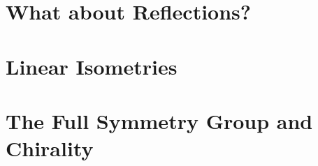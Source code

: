 \documentclass[11pt, oneside]{article}   	%
\begin{document}
\section{What about Reflections?}
\be
\item 
\item 
\item 
\item 
\item 
\ee
\section{Linear Isometries}
\be
\item 
\item 
\item 
\item 
\item 
\ee
\section{The Full Symmetry Group and Chirality}
\be
\item 
\item 
\item 
\item 
\item 
\item 
\ee
\end{document}
